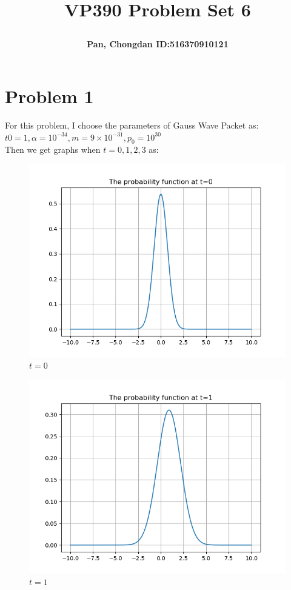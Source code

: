 \documentclass[a4paper]{article}
\title{\Large \textbf{VP390 Problem Set 6}\\
\author{\textbf{Pan, Chongdan ID:516370910121}\\
}
}
\begin{document}
\maketitle
\section{Problem 1}
    For this problem, I choose the parameters of Gauss Wave Packet as: 
    \\$t0=1,\alpha=10^{-34},m=9\times10^{-31},p_0=10^{30}$
    \\Then we get graphs when $t=0,1,2,3$ as:
    \begin{figure}[H]
        \centering
        \includegraphics[scale=0.75]{P1-0.png}
        \caption{$t=0$}
    \end{figure}
    \begin{figure}[H]
        \centering
        \includegraphics[scale=0.75]{P1-1.png}
        \caption{$t=1$}
    \end{figure}
\end{document}
